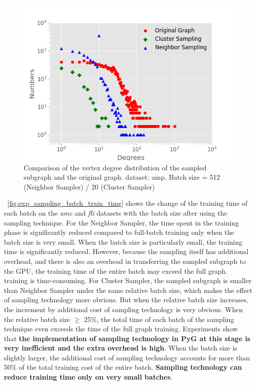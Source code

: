 \begin{figure}
    \centering
    \includegraphics[width=0.7\columnwidth]{figs/experiments/exp_sampling_minibatch_degrees_distribution_amazon-photo.png}
    \caption{Comparison of the vertex degree distribution of the sampled subgraph and the original graph. dataset: amp. Batch size = 512 (Neighbor Sampler) / 20 (Cluster Sampler)}
    \label{fig:exp_sampling_minibatch_degrees_distribution}
\end{figure}

\figurename~\ref{fig:exp_sampling_batch_train_time} shows the change of the training time of each batch on the \textit{amc} and \textit{fli} datasets with the batch size after using the sampling technique.
For the Neighbor Sampler, the time spent in the training phase is significantly reduced compared to full-batch training only when the batch size is very small. 
When the batch size is particularly small, the training time is significantly reduced. However, because the sampling itself has additional overhead, 
and there is also an overhead in transferring the sampled subgraph to the GPU, the training time of the entire batch may exceed the full graph. 
training is time-consuming. For Cluster Sampler, the sampled subgraph is smaller than Neighbor Sampler under the same relative batch size,
which makes the effect of sampling technology more obvious. But when the relative batch size increases, 
the increment by additional cost of sampling technology is very obvious. When the relative batch size $\geq$ 25\%,
the total time of each batch of the sampling technique even exceeds the time of the full graph training. 
Experiments show that \textbf{the implementation of sampling technology in PyG at this stage is very inefficient and the extra overhead is high}.
When the batch size is slightly larger, the additional cost of sampling technology accounts for more than 50\% of the total training cost of the entire batch.
\textbf{Sampling technology can reduce training time only on very small batches}.

